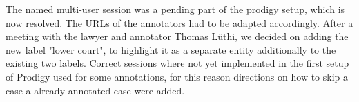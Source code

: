 \documentclass{article}
\begin{document}
\begin{mdframed}[frametitle={Change log}]
\begin{itemize}
    The named multi-user session was a pending part of the prodigy setup, which is now resolved. The URLs of the annotators had to be adapted accordingly. After a meeting with the lawyer and annotator Thomas Lüthi, we decided on adding the new label "lower court", to highlight it as a separate entity additionally to the existing two labels. 
    Correct sessions where not yet implemented in the first setup of Prodigy used for some annotations, for this reason directions on how to skip a case a already annotated case were added.
    
\end{itemize}
\end{mdframed}



\listoffigures
\end{document}
